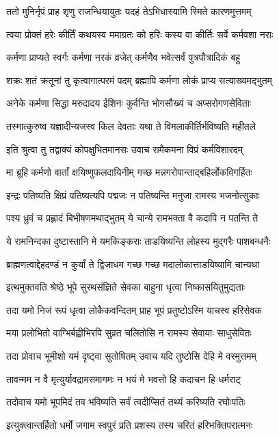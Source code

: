 \twolineshloka
{ततो मुनिर्नृपं प्राह शृणु राजन्धियायुतः}
{यदहं तेऽभिधास्यामि स्मिते कारणमुत्तमम्}%

\twolineshloka
{त्वया प्रोक्तं हरेः कीर्तिं कथयस्व ममाग्रतः}
{को हरिः कस्य वा कीर्तिः सर्वे कर्मवशा नराः}%

\twolineshloka
{कर्मणा प्राप्यते स्वर्गः कर्मणा नरकं व्रजेत्}
{कर्मणैव भवेत्सर्वं पुत्रपौत्रादिकं बहु}%

\twolineshloka
{शक्रः शतं क्रतूनां तु कृत्वागात्परमं पदम्}
{ब्रह्मापि कर्मणा लोकं प्राप्य सत्याख्यमद्भुतम्}%

\twolineshloka
{अनेके कर्मणा सिद्धा मरुदादय ईशिनः}
{कुर्वन्ति भोगसौख्यं च अप्सरोगणसेविताः}%

\twolineshloka
{तस्मात्कुरुष्व यज्ञादीन्यजस्व किल देवताः}
{यथा ते विमलाकीर्तिर्भविष्यति महीतले}%

\twolineshloka
{इति श्रुत्वा तु तद्वाक्यं कोपक्षुभितमानसः}
{उवाच रामैकमना विप्रं कर्मविशारदम्}%

\twolineshloka
{मा ब्रूहि कर्मणो वार्तां क्षयिष्णुफलदायिनीम्}
{गच्छ मन्नगरोपान्ताद्बहिर्लोकविगर्हितः}%

\twolineshloka
{इन्द्रः पतिष्यति क्षिप्रं पतिष्यत्यपि पद्मजः}
{न पतिष्यन्ति मनुजा रामस्य भजनोत्सुकाः}%

\twolineshloka
{पश्य ध्रुवं च प्रह्लादं बिभीषणमथाद्भुतम्}
{ये चान्ये रामभक्ता वै कदापि न पतन्ति ते}%

\twolineshloka
{ये रामनिन्दका दुष्टास्तानि मे यमकिङ्कराः}
{ताडयिष्यन्ति लोहस्य मुद्गरैः पाशबन्धनैः}%

\twolineshloka
{ब्राह्मणत्वाद्देहदण्डं न कुर्यां ते द्विजाधम}
{गच्छ गच्छ मदालोकात्ताडयिष्यामि चान्यथा}%

\twolineshloka
{इत्थमुक्तवति श्रेष्ठे भूपे सुरथसंज्ञिते}
{सेवका बाहुना धृत्वा निष्कासयितुमुद्यताः}%

\twolineshloka
{तदा यमो निजं रूपं धृत्वा लोकैकवन्दितम्}
{प्राह भूपं प्रतुष्टोऽस्मि याचस्व हरिसेवक}%

\twolineshloka
{मया प्रलोभितो वाग्भिर्बह्वीभिरपि सुव्रत}
{चलितोसि न रामस्य सेवायाः साधुसेवितः}%

\twolineshloka
{तदा प्रोवाच भूमीशो यमं दृष्ट्वा सुतोषितम्}
{उवाच यदि तुष्टोसि देहि मे वरमुत्तमम्}%

\twolineshloka
{तावन्मम न वै मृत्युर्यावद्रामसमागमः}
{न भयं मे भवत्तो हि कदाचन हि धर्मराट्}%

\twolineshloka
{तदोवाच यमो भूपमिदं तव भविष्यति}
{सर्वं त्वदीप्सितं तथ्यं करिष्यति रघोःपतिः}%

\twolineshloka
{इत्युक्त्वान्तर्हितो धर्मो जगाम स्वपुरं प्रति}
{प्रशस्य तस्य चरितं हरिभक्तिपरात्मनः}%

